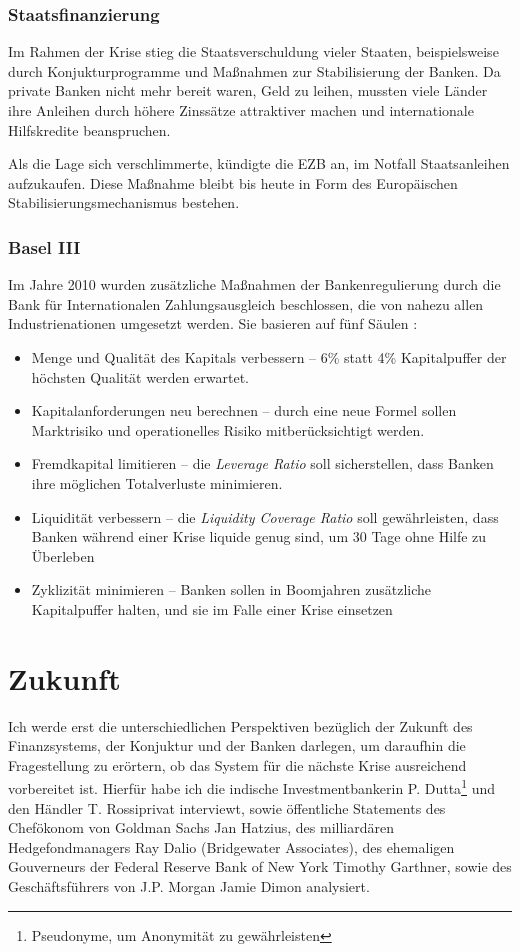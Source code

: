 \documentclass[a4paper,11pt]{report}
\begin{document}
\subsection{Staatsfinanzierung}
Im Rahmen der Krise stieg die Staatsverschuldung vieler Staaten,
beispielsweise durch Konjukturprogramme und Maßnahmen zur Stabilisierung
der Banken. Da private Banken nicht mehr bereit waren,
Geld zu leihen, mussten viele L\"ander ihre Anleihen durch h\"ohere
Zinss\"atze attraktiver machen und internationale Hilfskredite beanspruchen.

Als die Lage sich verschlimmerte, k\"undigte die EZB an, im Notfall
Staatsanleihen aufzukaufen. Diese Maßnahme bleibt bis heute in Form
des Europäischen Stabilisierungsmechanismus bestehen.

\subsection{Basel III}
Im Jahre 2010 wurden zus\"atzliche Maßnahmen der Bankenregulierung
durch die Bank für Internationalen Zahlungsausgleich
beschlossen, die von nahezu allen Industrienationen umgesetzt werden.
Sie basieren auf f\"unf S\"aulen \parencite{baseliii}:
\begin{itemize}
 \item Menge und Qualit\"at des Kapitals verbessern -- 6\% statt 4\%
Kapitalpuffer der h\"ochsten Qualit\"at werden erwartet.
 \item Kapitalanforderungen neu berechnen -- durch eine neue Formel sollen
 Marktrisiko und operationelles Risiko mitber\"ucksichtigt werden.
 \item Fremdkapital limitieren -- die \textit{Leverage Ratio} soll sicherstellen,
 dass Banken ihre m\"oglichen Totalverluste minimieren.
 \item Liquidit\"at verbessern -- die \textit{Liquidity Coverage Ratio} soll gew\"ahrleisten,
 dass Banken w\"ahrend einer Krise liquide genug sind, um 30 Tage ohne Hilfe zu \"Uberleben
 \item Zyklizit\"at minimieren -- Banken sollen in Boomjahren zus\"atzliche Kapitalpuffer
 halten, und sie im Falle einer Krise einsetzen
\end{itemize}

\chapter{Zukunft}
Ich werde erst die unterschiedlichen Perspektiven bez\"uglich der
Zukunft des Finanzsystems, der Konjuktur und der Banken
darlegen, um daraufhin die Fragestellung
zu er\"ortern, ob das System f\"ur die n\"achste
Krise ausreichend vorbereitet ist.
Hierf\"ur habe ich die indische Investmentbankerin P. Dutta\footnote{Pseudonyme,
um Anonymit\"at zu gew\"ahrleisten}
und den H\"andler T. Rossi\footnotemark[1] privat interviewt, sowie \"offentliche
Statements des Chef\"okonom von Goldman Sachs Jan Hatzius,
des milliard\"aren Hedgefondmanagers Ray Dalio (Bridgewater Associates), des ehemaligen 
Gouverneurs der Federal Reserve Bank of New York Timothy Garthner,
sowie des Gesch\"aftsf\"uhrers von J.P. Morgan Jamie Dimon analysiert.
\end{document}
